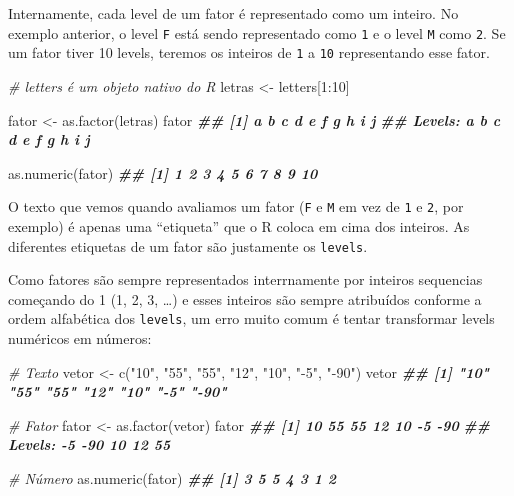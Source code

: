 \documentclass[
]{book}
\newenvironment{Shaded}{\begin{snugshade}}{\end{snugshade}}
\newcommand{\CommentTok}[1]{\textcolor[rgb]{0.56,0.35,0.01}{\textit{#1}}}
\newcommand{\DecValTok}[1]{\textcolor[rgb]{0.00,0.00,0.81}{#1}}
\newcommand{\DocumentationTok}[1]{\textcolor[rgb]{0.56,0.35,0.01}{\textbf{\textit{#1}}}}
\newcommand{\FunctionTok}[1]{\textcolor[rgb]{0.00,0.00,0.00}{#1}}
\newcommand{\NormalTok}[1]{#1}
\newcommand{\OtherTok}[1]{\textcolor[rgb]{0.56,0.35,0.01}{#1}}
\newcommand{\SpecialCharTok}[1]{\textcolor[rgb]{0.00,0.00,0.00}{#1}}
\newcommand{\StringTok}[1]{\textcolor[rgb]{0.31,0.60,0.02}{#1}}
\begin{document}
Internamente, cada level de um fator é representado como um inteiro. No exemplo anterior, o level \texttt{F} está sendo representado como \texttt{1} e o level \texttt{M} como \texttt{2}. Se um fator tiver 10 levels, teremos os inteiros de \texttt{1} a \texttt{10} representando esse fator.

\begin{Shaded}
\begin{Highlighting}[]
\CommentTok{\# letters é um objeto nativo do R}
\NormalTok{letras }\OtherTok{\textless{}{-}}\NormalTok{ letters[}\DecValTok{1}\SpecialCharTok{:}\DecValTok{10}\NormalTok{]}

\NormalTok{fator }\OtherTok{\textless{}{-}} \FunctionTok{as.factor}\NormalTok{(letras)}
\NormalTok{fator}
\DocumentationTok{\#\#  [1] a b c d e f g h i j}
\DocumentationTok{\#\# Levels: a b c d e f g h i j}

\FunctionTok{as.numeric}\NormalTok{(fator)}
\DocumentationTok{\#\#  [1]  1  2  3  4  5  6  7  8  9 10}
\end{Highlighting}
\end{Shaded}

O texto que vemos quando avaliamos um fator (\texttt{F} e \texttt{M} em vez de \texttt{1} e \texttt{2}, por exemplo) é apenas uma ``etiqueta'' que o R coloca em cima dos inteiros. As diferentes etiquetas de um fator são justamente os \texttt{levels}.

Como fatores são sempre representados interrnamente por inteiros sequencias começando do 1 (1, 2, 3, \ldots) e esses inteiros são sempre atribuídos conforme a ordem alfabética dos \texttt{levels}, um erro muito comum é tentar transformar levels numéricos em números:

\begin{Shaded}
\begin{Highlighting}[]
\CommentTok{\# Texto}
\NormalTok{vetor }\OtherTok{\textless{}{-}} \FunctionTok{c}\NormalTok{(}\StringTok{"10"}\NormalTok{, }\StringTok{"55"}\NormalTok{, }\StringTok{"55"}\NormalTok{, }\StringTok{"12"}\NormalTok{, }\StringTok{"10"}\NormalTok{, }\StringTok{"{-}5"}\NormalTok{, }\StringTok{"{-}90"}\NormalTok{)}
\NormalTok{vetor}
\DocumentationTok{\#\# [1] "10"  "55"  "55"  "12"  "10"  "{-}5"  "{-}90"}

\CommentTok{\# Fator}
\NormalTok{fator }\OtherTok{\textless{}{-}} \FunctionTok{as.factor}\NormalTok{(vetor)}
\NormalTok{fator}
\DocumentationTok{\#\# [1] 10  55  55  12  10  {-}5  {-}90}
\DocumentationTok{\#\# Levels: {-}5 {-}90 10 12 55}

\CommentTok{\# Número}
\FunctionTok{as.numeric}\NormalTok{(fator)}
\DocumentationTok{\#\# [1] 3 5 5 4 3 1 2}
\end{Highlighting}
\end{Shaded}
\end{document}
